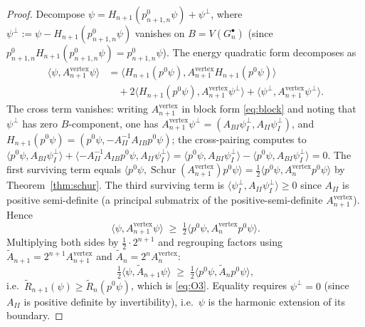 \documentclass[11pt]{article}
\theoremstyle{plain}
\theoremstyle{definition}
\theoremstyle{remark}
\newcommand{\Schur}{\operatorname{Schur}}
\begin{document}
\begin{proof}
Decompose $\psi = H_{n+1}(p^{0}_{n+1, n} \psi) + \psi^{\perp}$, where
$\psi^{\perp} := \psi - H_{n+1}(p^{0}_{n+1, n} \psi)$ vanishes on
$B = V(G_n^{\bullet})$ (since
$p^{0}_{n+1, n} H_{n+1}(p^{0}_{n+1, n} \psi) = p^{0}_{n+1, n} \psi$).
The energy quadratic form decomposes as
\begin{align*}
\langle \psi, A_{n+1}^{\mathrm{vertex}} \psi\rangle
  & = \langle H_{n+1}(p^{0} \psi), A_{n+1}^{\mathrm{vertex}} H_{n+1}(p^{0} \psi)\rangle \\
  & \quad + 2 \langle H_{n+1}(p^{0} \psi), A_{n+1}^{\mathrm{vertex}} \psi^{\perp}\rangle
       + \langle \psi^{\perp}, A_{n+1}^{\mathrm{vertex}} \psi^{\perp}\rangle.
\end{align*}
The cross term vanishes: writing
$A_{n+1}^{\mathrm{vertex}}$ in block form \eqref{eq:block} and noting
that $\psi^{\perp}$ has zero $B$-component, one has
$A_{n+1}^{\mathrm{vertex}} \psi^{\perp} = (A_{BI} \psi^{\perp}_{I}, A_{II} \psi^{\perp}_{I})$,
and $H_{n+1}(p^{0} \psi) = (p^{0} \psi, -A_{II}^{-1} A_{IB} p^{0} \psi)$;
the cross-pairing computes to
$\langle p^{0} \psi, A_{BI} \psi^{\perp}_{I}\rangle
+ \langle -A_{II}^{-1} A_{IB} p^{0} \psi, A_{II} \psi^{\perp}_{I}\rangle
= \langle p^{0} \psi, A_{BI} \psi^{\perp}_{I}\rangle
- \langle p^{0} \psi, A_{BI} \psi^{\perp}_{I}\rangle = 0$.
The first surviving term equals
$\langle p^{0} \psi, \Schur(A_{n+1}^{\mathrm{vertex}}) p^{0} \psi\rangle =
\tfrac12 \langle p^{0} \psi, A_n^{\mathrm{vertex}} p^{0} \psi\rangle$
by Theorem~\ref{thm:schur}. The third surviving term is
$\langle \psi^{\perp}_{I}, A_{II} \psi^{\perp}_{I}\rangle \ge 0$
since $A_{II}$ is positive semi-definite (a principal submatrix of
the positive-semi-definite $A_{n+1}^{\mathrm{vertex}}$). Hence
\begin{equation*}
\langle \psi, A_{n+1}^{\mathrm{vertex}} \psi\rangle
\;\ge\;
\tfrac12 \langle p^{0} \psi, A_n^{\mathrm{vertex}} p^{0} \psi\rangle.
\end{equation*}
Multiplying both sides by $\tfrac12 \cdot 2^{n+1}$ and regrouping
factors using
$\widetilde A_{n+1} = 2^{n+1} A_{n+1}^{\mathrm{vertex}}$ and
$\widetilde A_n = 2^{n} A_n^{\mathrm{vertex}}$:
\[
   \tfrac12 \langle \psi, \widetilde A_{n+1} \psi\rangle
   \;\ge\; \tfrac12 \langle p^{0} \psi, \widetilde A_n p^{0} \psi\rangle,
\]
i.e.\
$\widetilde R_{n+1}(\psi) \ge \widetilde R_n(p^{0} \psi)$, which is
\eqref{eq:O3}. Equality requires $\psi^{\perp} = 0$ (since $A_{II}$
is positive definite by invertibility), i.e.\ $\psi$ is the harmonic
extension of its boundary.
\end{proof}
\end{document}

